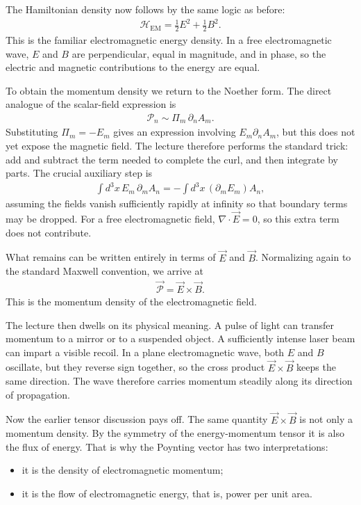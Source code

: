 The Hamiltonian density now follows by the same logic as before:
\begin{align}
\mathcal H_{\mathrm{EM}}=\frac12E^2+\frac12B^2.
\end{align}
This is the familiar electromagnetic energy density. In a free electromagnetic wave, \(E\) and \(B\) are perpendicular, equal in magnitude, and in phase, so the electric and magnetic contributions to the energy are equal.

To obtain the momentum density we return to the Noether form. The direct analogue of the scalar-field expression is
\begin{align}
\mathcal P_n \sim \Pi_m\,\partial_n A_m.
\end{align}
Substituting \(\Pi_m=-E_m\) gives an expression involving \(E_m\partial_n A_m\), but this does not yet expose the magnetic field. The lecture therefore performs the standard trick: add and subtract the term needed to complete the curl, and then integrate by parts. The crucial auxiliary step is
\begin{align}
\int d^3x\,E_m\,\partial_m A_n
=
-\int d^3x\,(\partial_mE_m)A_n,
\end{align}
assuming the fields vanish sufficiently rapidly at infinity so that boundary terms may be dropped. For a free electromagnetic field, \(\nabla\cdot \vec E=0\), so this extra term does not contribute.

What remains can be written entirely in terms of \(\vec E\) and \(\vec B\). Normalizing again to the standard Maxwell convention, we arrive at
\begin{align}
\vec{\mathcal P}=\vec E\times \vec B.
\end{align}
This is the momentum density of the electromagnetic field.

The lecture then dwells on its physical meaning. A pulse of light can transfer momentum to a mirror or to a suspended object. A sufficiently intense laser beam can impart a visible recoil. In a plane electromagnetic wave, both \(E\) and \(B\) oscillate, but they reverse sign together, so the cross product \(\vec E\times \vec B\) keeps the same direction. The wave therefore carries momentum steadily along its direction of propagation.

Now the earlier tensor discussion pays off. The same quantity \(\vec E\times \vec B\) is not only a momentum density. By the symmetry of the energy-momentum tensor it is also the flux of energy. That is why the Poynting vector has two interpretations:
\begin{itemize}
\item it is the density of electromagnetic momentum;
\item it is the flow of electromagnetic energy, that is, power per unit area.
\end{itemize}

